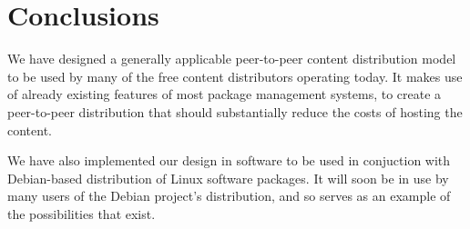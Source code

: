 \documentclass[conference]{IEEEtran}
\begin{document}

\section{Conclusions}
\label{conclusions}

We have designed a generally applicable peer-to-peer content
distribution model to be used by many of the free content
distributors operating today. It makes use of already existing
features of most package management systems, to create a
peer-to-peer distribution that should substantially reduce the costs
of hosting the content.

We have also implemented our design in software to be used in
conjuction with Debian-based distribution of Linux software
packages. It will soon be in use by many users of the Debian
project's distribution, and so serves as an example of the
possibilities that exist.



\end{document}
